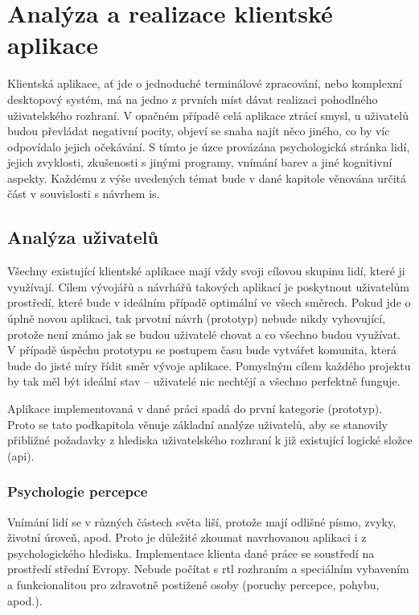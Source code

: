 \chapter{Analýza a realizace klientské aplikace}


Klientská aplikace, ať jde o jednoduché terminálové zpracování, nebo komplexní desktopový systém, má na jedno z prvních míst dávat realizaci pohodlného uživatelského rozhraní. V opačném případě celá aplikace ztrácí smysl, u uživatelů budou převládat negativní pocity, objeví se snaha najít něco jiného, co by víc odpovídalo jejich očekávání. S tímto je úzce provázána psychologická stránka lidí, jejich zvyklosti, zkušenosti s jinými programy, vnímání barev a jiné kognitivní aspekty. Každému z výše uvedených témat bude v dané kapitole věnována určitá část v souvislosti s návrhem \gls{is}.



\section{Analýza uživatelů}

Všechny existující klientské aplikace mají vždy svoji cílovou skupinu lidí, které ji využívají. Cílem vývojářů a návrhářů takových aplikací je poskytnout uživatelům prostředí, které bude v ideálním případě optimální ve všech směrech. Pokud jde o úplně novou aplikaci, tak prvotní návrh (prototyp) nebude nikdy vyhovující, protože není známo jak se budou uživatelé chovat a co všechno budou využívat. V případě úspěchu prototypu se postupem času bude vytvářet komunita, která bude do jisté míry řídit směr vývoje aplikace. Pomyslným cílem každého projektu by tak měl být ideální stav -- uživatelé nic nechtějí a všechno perfektně funguje.

Aplikace implementovaná v dané práci spadá do první kategorie (prototyp). Proto se tato podkapitola věnuje základní analýze uživatelů, aby se stanovily přibližné požadavky z hlediska uživatelského rozhraní k již existující logické složce (\gls{api}).


\subsection{Psychologie percepce}

Vnímání lidí se v různých částech světa liší, protože mají odlišné písmo, zvyky, životní úroveň, apod. Proto je důležité zkoumat navrhovanou aplikaci i z psychologického hlediska. Implementace klienta dané práce se soustředí na prostředí střední Evropy. Nebude počítat s \gls{rtl} rozhraním a speciálním vybavením a funkcionalitou pro zdravotně postižené osoby (poruchy percepce, pohybu, apod.). 

